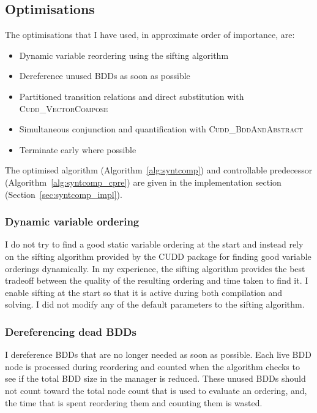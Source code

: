 \subsection{Optimisations}
\label{sec:syntcomp_optimisations}

The optimisations that I have used, in approximate order of importance, are:
\begin{itemize}
    \item Dynamic variable reordering using the sifting algorithm \cite{Rudell_1993}
    \item Dereference unused BDDs as soon as possible
    \item Partitioned transition relations \cite{Burch_91} and direct substitution with \textsc{Cudd\_VectorCompose}
    \item Simultaneous conjunction and quantification with \textsc{Cudd\_BddAndAbstract}
    \item Terminate early where possible
\end{itemize}

The optimised algorithm (Algorithm~\ref{alg:syntcomp}) and controllable predecessor (Algorithm~\ref{alg:syntcomp_cpre}) are given in the implementation section (Section~\ref{sec:syntcomp_impl}).

\subsubsection{Dynamic variable ordering}
I do not try to find a good static variable ordering at the start and instead rely on the sifting algorithm provided by the CUDD package for finding good variable orderings dynamically. In my experience, the sifting algorithm provides the best tradeoff between the quality of the resulting ordering and time taken to find it. I enable sifting at the start so that it is active during both compilation and solving. I did not modify any of the default parameters to the sifting algorithm.

\subsubsection{Dereferencing dead BDDs}
I dereference BDDs that are no longer needed as soon as possible. Each live BDD node is processed during reordering and counted when the algorithm checks to see if the total BDD size in the manager is reduced. These unused BDDs should not count toward the total node count that is used to evaluate an ordering, and, the time that is spent reordering them and counting them is wasted. 

